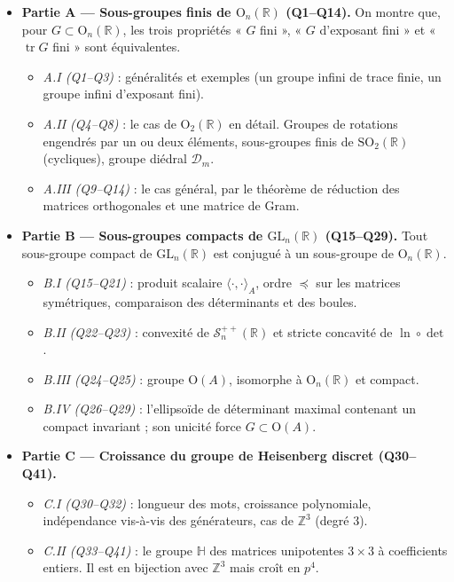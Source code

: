 \documentclass[11pt,a4paper]{article}
\providecommand{\tightlist}{\setlength{\itemsep}{0pt}\setlength{\parskip}{0pt}}
\begin{document}
\begin{itemize}
\tightlist
\item
  \textbf{Partie A --- Sous-groupes finis de \({\mathrm{O}}_n(\mathbb{R})\) (Q1--Q14).} On montre que, pour \(G\subset{\mathrm{O}}_n(\mathbb{R})\), les trois propriétés « \(G\) fini », « \(G\) d'exposant fini » et « \(\operatorname{tr}G\) fini » sont équivalentes.

  \begin{itemize}
  \tightlist
  \item
    \emph{A.I (Q1--Q3)} : généralités et exemples (un groupe infini de trace finie, un groupe infini d'exposant fini).
  \item
    \emph{A.II (Q4--Q8)} : le cas de \({\mathrm{O}}_2(\mathbb{R})\) en détail. Groupes de rotations engendrés par un ou deux éléments, sous-groupes finis de \({\mathrm{SO}}_2(\mathbb{R})\) (cycliques), groupe diédral \({\mathcal{D}}_m\).
  \item
    \emph{A.III (Q9--Q14)} : le cas général, par le théorème de réduction des matrices orthogonales et une matrice de Gram.
  \end{itemize}
\item
  \textbf{Partie B --- Sous-groupes compacts de \({\mathrm{GL}}_n(\mathbb{R})\) (Q15--Q29).} Tout sous-groupe compact de \({\mathrm{GL}}_n(\mathbb{R})\) est conjugué à un sous-groupe de \({\mathrm{O}}_n(\mathbb{R})\).

  \begin{itemize}
  \tightlist
  \item
    \emph{B.I (Q15--Q21)} : produit scalaire \(\langle\cdot,\cdot\rangle_A\), ordre \(\preccurlyeq\) sur les matrices symétriques, comparaison des déterminants et des boules.
  \item
    \emph{B.II (Q22--Q23)} : convexité de \({\mathcal{S}}_n^{++}(\mathbb{R})\) et stricte concavité de \(\ln\circ\det\).
  \item
    \emph{B.III (Q24--Q25)} : groupe \(\mathrm{O}(A)\), isomorphe à \({\mathrm{O}}_n(\mathbb{R})\) et compact.
  \item
    \emph{B.IV (Q26--Q29)} : l'ellipsoïde de déterminant maximal contenant un compact invariant ; son unicité force \(G\subset\mathrm{O}(A)\).
  \end{itemize}
\item
  \textbf{Partie C --- Croissance du groupe de Heisenberg discret (Q30--Q41).}

  \begin{itemize}
  \tightlist
  \item
    \emph{C.I (Q30--Q32)} : longueur des mots, croissance polynomiale, indépendance vis-à-vis des générateurs, cas de \({\mathbb{Z}}^3\) (degré 3).
  \item
    \emph{C.II (Q33--Q41)} : le groupe \(\mathbb{H}\) des matrices unipotentes \(3\times3\) à coefficients entiers. Il est en bijection avec \({\mathbb{Z}}^3\) mais croît en \(p^4\).
  \end{itemize}
\end{itemize}
\end{document}
